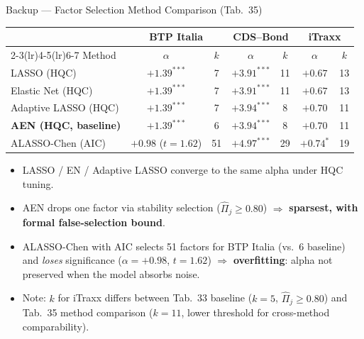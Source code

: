 \documentclass[aspectratio=169,11pt]{beamer}
\newcommand{\hlt}[1]{\textcolor{edhecred}{\textbf{#1}}}     %
\newcommand{\hltb}[1]{\textcolor{accentblue}{\textbf{#1}}}  %
\begin{document}
\begin{frame}[t]{Backup --- Factor Selection Method Comparison (Tab.\ 35)}
\centering
\scriptsize
\vspace{0.10cm}

\renewcommand{\arraystretch}{1.20}
\setlength{\tabcolsep}{5pt}

\begin{tabular}{lcccccc}
\toprule
 & \multicolumn{2}{c}{BTP Italia} & \multicolumn{2}{c}{CDS--Bond} & \multicolumn{2}{c}{iTraxx} \\
\cmidrule(lr){2-3}\cmidrule(lr){4-5}\cmidrule(lr){6-7}
Method                          & $\alpha$        & $k$ & $\alpha$        & $k$ & $\alpha$    & $k$ \\
\midrule
LASSO (HQC)                     & $+1.39^{***}$   & 7  & $+3.91^{***}$   & 11 & $+0.67$     & 13 \\
Elastic Net (HQC)               & $+1.39^{***}$   & 7  & $+3.91^{***}$   & 11 & $+0.67$     & 13 \\
Adaptive LASSO (HQC)            & $+1.39^{***}$   & 7  & $+3.94^{***}$   & 8  & $+0.70$     & 11 \\
\textbf{AEN (HQC, baseline)}    & $+1.39^{***}$   & 6  & $+3.94^{***}$   & 8  & $+0.70$     & 11 \\
ALASSO-Chen (AIC)               & $+0.98$ ($t=1.62$) & 51 & $+4.97^{***}$ & 29 & $+0.74^{*}$ & 19 \\
\bottomrule
\end{tabular}

\vspace{0.40cm}

\begin{itemize}\itemsep=0.06cm\footnotesize
  \item LASSO / EN / Adaptive LASSO converge to the same alpha under HQC tuning.
  \item AEN drops one factor via stability selection ($\hat\Pi_j \geq 0.80$) $\Rightarrow$ \hlt{sparsest, with formal false-selection bound}.
  \item ALASSO-Chen with AIC selects 51 factors for BTP Italia (vs.\ 6 baseline) and \emph{loses} significance ($\alpha = +0.98$, $t = 1.62$) $\Rightarrow$ \hltb{overfitting}: alpha not preserved when the model absorbs noise.
  \item Note: $k$ for iTraxx differs between Tab.\ 33 baseline ($k=5$, $\hat\Pi_j \geq 0.80$) and Tab.\ 35 method comparison ($k=11$, lower threshold for cross-method comparability).
\end{itemize}

\end{frame}
\end{document}
